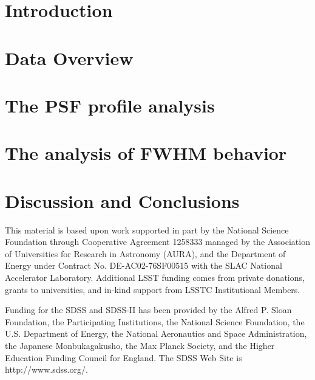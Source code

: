 \documentclass[12pt,preprint]{aastex}
\begin{document}


\section{Introduction}

 

\section{Data Overview} 

 


\section{The PSF profile analysis}

 

\section{The analysis of FWHM behavior} 

 

\section{Discussion and Conclusions} 

 


\acknowledgments

This material is based upon work supported in part by the National Science Foundation through
Cooperative Agreement 1258333 managed by the Association of Universities for Research in Astronomy
(AURA), and the Department of Energy under Contract No. DE-AC02-76SF00515 with the SLAC National
Accelerator Laboratory. Additional LSST funding comes from private donations, grants to universities,
and in-kind support from LSSTC Institutional Members.

Funding for the SDSS and SDSS-II has been provided by the Alfred
P. Sloan Foundation, the Participating Institutions, the National
Science Foundation, the U.S. Department of Energy, the National
Aeronautics and Space Administration, the Japanese Monbukagakusho, the
Max Planck Society, and the Higher Education Funding Council for
England. The SDSS Web Site is http://www.sdss.org/.



\end{document}
